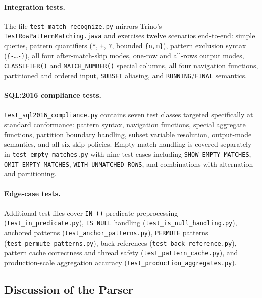 \paragraph{Integration tests.}
The file \texttt{test\_match\_recognize.py} mirrors Trino's
\texttt{TestRowPatternMatching.java} and exercises twelve scenarios
end-to-end: simple queries, pattern quantifiers (\texttt{*}, \texttt{+},
\texttt{?}, bounded \texttt{\{n,m\}}), pattern exclusion syntax
(\texttt{\{-\ldots-\}}), all four after-match-skip modes,
one-row and all-rows output modes, \texttt{CLASSIFIER()} and
\texttt{MATCH\_NUMBER()} special columns, all four navigation functions,
partitioned and ordered input, \texttt{SUBSET} aliasing, and
\texttt{RUNNING}/\texttt{FINAL} semantics.

\paragraph{SQL:2016 compliance tests.}
\texttt{test\_sql2016\_compliance.py} contains seven test classes
targeted specifically at standard conformance: pattern syntax,
navigation functions, special aggregate functions, partition
boundary handling, subset variable resolution, output-mode
semantics, and all six skip policies.  Empty-match handling is
covered separately in \texttt{test\_empty\_matches.py} with nine
test cases including \texttt{SHOW EMPTY MATCHES},
\texttt{OMIT EMPTY MATCHES}, \texttt{WITH UNMATCHED ROWS}, and
combinations with alternation and partitioning.

\paragraph{Edge-case tests.}
Additional test files cover \texttt{IN~()} predicate preprocessing
(\texttt{test\_in\_predicate.py}),
\texttt{IS~NULL} handling (\texttt{test\_is\_null\_handling.py}),
anchored patterns (\texttt{test\_anchor\_patterns.py}),
\texttt{PERMUTE} patterns (\texttt{test\_permute\_patterns.py}),
back-references (\texttt{test\_back\_reference.py}),
pattern cache correctness and thread safety
(\texttt{test\_pattern\_cache.py}), and
production-scale aggregation accuracy
(\texttt{test\_production\_aggregates.py}).

\subsection{Discussion of the Parser}
\label{subsec:meth-parser-discussion}

